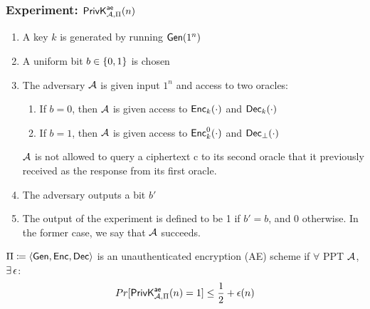 \documentclass[12pt]{article}
\begin{document}
\subsubsection{Experiment: $\mathsf{PrivK}_{\mathcal{A},\Pi}^\mathsf{ae}(n)$}
\begin{enumerate}
\item A key $k$ is generated by running $\operatorname{\mathsf{Gen}}(1^n)$
\item A uniform bit $b \in \{0,1\}$ is chosen
\item The adversary $\mathcal{A}$ is given input $1^n$ and access to two oracles:
	\begin{enumerate}
	\item If $b=0$, then $\mathcal{A}$ is given access to $\operatorname{\mathsf{Enc}}_k(\cdot)$ and $\operatorname{\mathsf{Dec}}_k(\cdot)$
	\item If $b=1$, then $\mathcal{A}$ is given access to $\operatorname{\mathsf{Enc}}_k^0(\cdot)$ and $\operatorname{\mathsf{Dec}}_{\perp}(\cdot)$
	\end{enumerate}
	$\mathcal{A}$ is not allowed to query a ciphertext c to its second oracle that it previously received as the response from its first oracle.
\item The adversary outputs a bit $b'$
\item The output of the experiment is defined to be 1 if $b'=b$, and 0 otherwise. In the former case, we say that $\mathcal{A}$ succeeds.
\end{enumerate}
$\Pi \coloneqq \langle \operatorname{\mathsf{Gen}}, \operatorname{\mathsf{Enc}}, \operatorname{\mathsf{Dec}} \rangle$ is an unauthenticated encryption (AE) scheme if $\forall$ PPT $\mathcal{A}$, $\exists\,\epsilon$:
\begin{equation*}
Pr[\mathsf{PrivK}_{\mathcal{A},\Pi}^\mathsf{ae}(n)=1] \le \frac12 + \epsilon(n)
\end{equation*}
\end{document}
